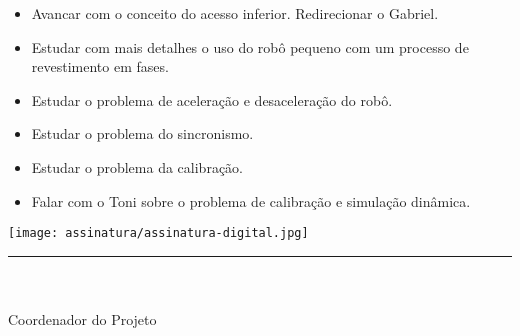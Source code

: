 \documentclass[12pt,a4paper]{article}
\begin{document}
\begin{itemize}
  \item Avancar com o conceito do acesso inferior. Redirecionar o Gabriel.

  \item Estudar com mais detalhes o uso do robô pequeno com um processo de revestimento em fases.

  \item Estudar o problema de aceleração e desaceleração do robô.
  
  \item Estudar o problema do sincronismo.

  \item Estudar o problema da calibração.

  \item Falar com o Toni sobre o problema de calibração e simulação dinâmica.

\end{itemize}




\vspace{20mm}%
\parbox[t]{70mm}{
  \centering
  \texttt{[image: assinatura/assinatura-digital.jpg]} \\[-4mm]
  \rule[2mm]{70mm}{0.1mm} \\
  \ramon \\[1mm]
  Coordenador do Projeto \\
}



\end{document}
